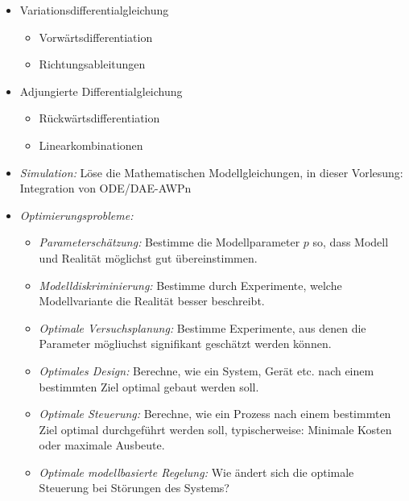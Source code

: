 \begin{itemize}
\item Variationsdifferentialgleichung
\begin{itemize}
	\item Vorwärtsdifferentiation
	\item Richtungsableitungen
\end{itemize}
\item Adjungierte Differentialgleichung
\begin{itemize}
	\item Rückwärtsdifferentiation
	\item Linearkombinationen
\end{itemize}
\end{itemize}



\begin{itemize}
\item \emph{Simulation:} Löse die Mathematischen Modellgleichungen, in dieser Vorlesung: Integration von ODE/DAE-AWPn
\item \emph{Optimierungsprobleme:}
\begin{itemize}
	\item \emph{Parameterschätzung:} Bestimme die Modellparameter $p$ so, dass Modell und Realität möglichst gut übereinstimmen.
	\item \emph{Modelldiskriminierung:} Bestimme durch Experimente, welche Modellvariante die Realität besser beschreibt.
	\item \emph{Optimale Versuchsplanung:} Bestimme Experimente, aus denen die Parameter mögliuchst signifikant geschätzt werden können.
	\item \emph{Optimales Design:} Berechne, wie ein System, Gerät etc. nach einem bestimmten Ziel optimal gebaut werden soll.
	\item \emph{Optimale Steuerung:} Berechne, wie ein Prozess nach einem bestimmten Ziel optimal durchgeführt werden soll, typischerweise: Minimale Kosten oder maximale Ausbeute.
	\item \emph{Optimale modellbasierte Regelung:} Wie ändert sich die optimale Steuerung bei Störungen des Systems?
\end{itemize}
\end{itemize}













